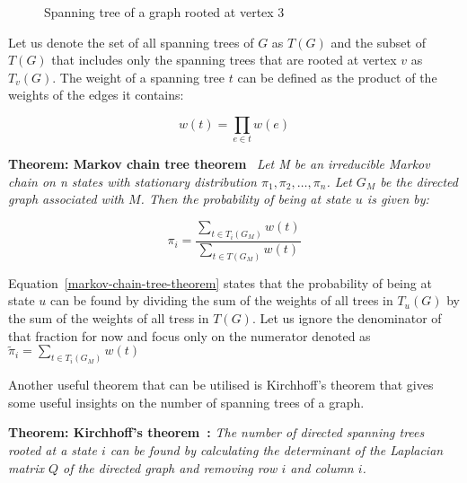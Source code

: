 \begin{figure}[H]
    \centering
    \caption{Spanning tree of a graph rooted at vertex 3}
    \label{fig:example_spanning_tree}
\end{figure}

Let us denote the set of all spanning trees of \(G\) as \(T(G)\)
and the subset of \(T(G)\) that includes only the spanning trees that are rooted
at vertex \(v\) as \(T_v(G)\).
The weight of a spanning tree \(t\) can be defined as the product of the weights
of the edges it contains:

\[
    w(t)=\prod_{e \in t} w(e)
\]


\textbf{Theorem: Markov chain tree theorem}~\cite{broder1989generating} \newline
\textit{Let M be an irreducible Markov chain on n states with stationary
distribution \(\pi_1, \pi_2, \dots, \pi_n\).
Let \(G_M\) be the directed graph associated with \(M\).
Then the probability of being at state \(u\) is given by:}

\begin{equation}\label{markov-chain-tree-theorem}
    \pi_i = \frac{\sum_{t \in T_i(G_M)} w(t)}{\sum_{t \in T(G_M)}w(t)}
\end{equation}

Equation~\ref{markov-chain-tree-theorem} states that the probability of being at
state \(u\) can be found by dividing the sum of the weights of all trees in
\(T_u(G)\) by the sum of the weights of all tress in \(T(G)\).
Let us ignore the denominator of that fraction for now and focus only on the
numerator denoted as \(\tilde{\pi}_i=\sum_{t \in T_i(G_M)} w(t)\)

Another useful theorem that can be utilised is Kirchhoff's theorem that gives
some useful insights on the number of spanning trees of a graph.

\textbf{Theorem: Kirchhoff's theorem~\cite{chaiken1978matrix}:}
\textit{The number of directed spanning trees rooted at a state \(i\) can be found
by calculating the determinant of the Laplacian matrix \(Q\) of the directed graph
and removing row \(i\) and column \(i\).}


